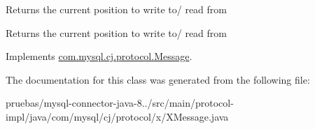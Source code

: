 Returns the current position to write to/ read from

\begin{DoxyReturn}{Returns}
the current position to write to/ read from 
\end{DoxyReturn}


Implements \mbox{\hyperlink{interfacecom_1_1mysql_1_1cj_1_1protocol_1_1_message_a87a2626f6e5aceccffe224bcaf0e126b}{com.\+mysql.\+cj.\+protocol.\+Message}}.



The documentation for this class was generated from the following file\+:\begin{DoxyCompactItemize}
\item 
pruebas/mysql-\/connector-\/java-\/8../src/main/protocol-\/impl/java/com/mysql/cj/protocol/x/X\+Message.\+java\end{DoxyCompactItemize}
